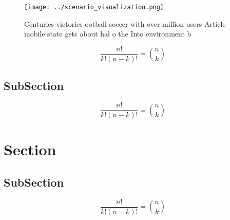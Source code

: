 \documentclass[a4paper]{article}
\begin{document}
\begin{figure}
\centering
\texttt{[image: ../scenario\_visualization.png]}
\caption{Centuries victories ootball soccer with over million users Article mobile state gets about hal o the Into environment b
}
\end{figure}
 
\[ \frac{n!}{k!(n-k)!} = \binom{n}{k} \]

\subsection{SubSection}

\[ \frac{n!}{k!(n-k)!} = \binom{n}{k} \]

\section{Section}

\subsection{SubSection}

\[ \frac{n!}{k!(n-k)!} = \binom{n}{k} \]
\end{document}
